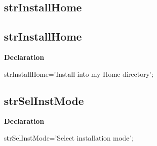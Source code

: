 \documentclass{report}
\newif\ifpdf
\begin{document}
\subsection*{\large{\textbf{strInstallHome}}\normalsize\hspace{1ex}\hrulefill}
\else
\subsection*{strInstallHome}
\fi
\label{trstrings-strInstallHome}
\begin{list}{}{
\setlength{\itemindent}{0cm}
\setlength{\listparindent}{0cm}
\setlength{\leftmargin}{\evensidemargin}
\addtolength{\leftmargin}{\tmplength}
\settowidth{\labelsep}{X}
\addtolength{\leftmargin}{\labelsep}
\setlength{\labelwidth}{\tmplength}
}
\item[\textbf{Declaration}\hfill]
\ifpdf
\begin{flushleft}
\fi
\begin{ttfamily}
strInstallHome='Install into my Home directory';\end{ttfamily}

\ifpdf
\end{flushleft}
\fi

\end{list}
\ifpdf
\subsection*{\large{\textbf{strSelInstMode}}\normalsize\hspace{1ex}\hrulefill}
\else
\subsection*{strSelInstMode}
\fi
\label{trstrings-strSelInstMode}
\begin{list}{}{
\setlength{\itemindent}{0cm}
\setlength{\listparindent}{0cm}
\setlength{\leftmargin}{\evensidemargin}
\addtolength{\leftmargin}{\tmplength}
\settowidth{\labelsep}{X}
\addtolength{\leftmargin}{\labelsep}
\setlength{\labelwidth}{\tmplength}
}
\item[\textbf{Declaration}\hfill]
\ifpdf
\begin{flushleft}
\fi
\begin{ttfamily}
strSelInstMode='Select installation mode';\end{ttfamily}

\ifpdf
\end{flushleft}
\fi

\end{list}
\ifpdf
\end{document}
